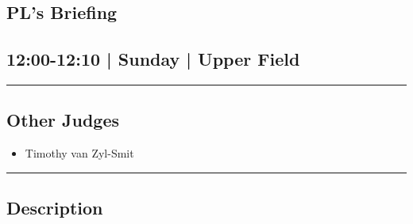 \documentclass[10pt, A5]{article}
\begin{document}
	

		\begin{framed}
			\begin{minipage}{\textwidth}

			\setcounter{section}{112}
							\section{PL's Briefing}
						
			\subsection*{12:00-12:10 | Sunday | Upper Field}

			\vspace{0.25cm}
			\hrule
			\vspace{0.25cm}


			\subsection*{Other Judges}
							

				\begin{multicols}{2}

			\begin{itemize}
											\item Timothy van Zyl-Smit
								\end{itemize}

			\vfill\null
			\columnbreak

			\begin{itemize}
								\end{itemize}

			\vfill\null

			\end{multicols}

			\vspace{0.25cm}
			\hrule
			\vspace{0.25cm}

			\begin{minipage}{\textwidth}
			\subsection*{\faListAlt \: Description}
			
			\end{minipage}


	\end{minipage}
	\end{framed}
\end{document}
